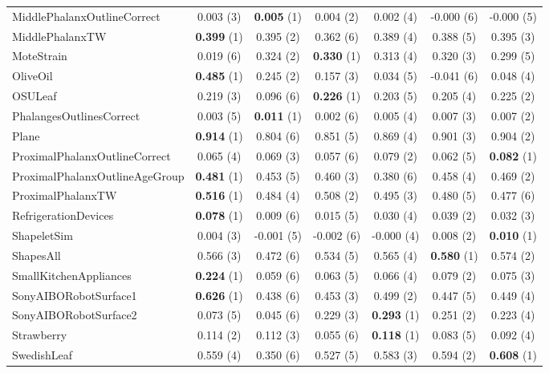 \begin{table}[ht]
\begin{adjustbox}{width=\textwidth}
\begin{tabular}{lcccccc}
    MiddlePhalanxOutlineCorrect & 0.003 (3) & \textbf{0.005} (1) & 0.004 (2) & 0.002 (4) & -0.000 (6) & -0.000 (5) \\
    MiddlePhalanxTW & \textbf{0.399} (1) & 0.395 (2) & 0.362 (6) & 0.389 (4) & 0.388 (5) & 0.395 (3) \\
    MoteStrain & 0.019 (6) & 0.324 (2) & \textbf{0.330} (1) & 0.313 (4) & 0.320 (3) & 0.299 (5) \\
    OliveOil & \textbf{0.485} (1) & 0.245 (2) & 0.157 (3) & 0.034 (5) & -0.041 (6) & 0.048 (4) \\
    OSULeaf & 0.219 (3) & 0.096 (6) & \textbf{0.226} (1) & 0.203 (5) & 0.205 (4) & 0.225 (2) \\
    PhalangesOutlinesCorrect & 0.003 (5) & \textbf{0.011} (1) & 0.002 (6) & 0.005 (4) & 0.007 (3) & 0.007 (2) \\
    Plane & \textbf{0.914} (1) & 0.804 (6) & 0.851 (5) & 0.869 (4) & 0.901 (3) & 0.904 (2) \\
    ProximalPhalanxOutlineCorrect & 0.065 (4) & 0.069 (3) & 0.057 (6) & 0.079 (2) & 0.062 (5) & \textbf{0.082} (1) \\
    ProximalPhalanxOutlineAgeGroup & \textbf{0.481} (1) & 0.453 (5) & 0.460 (3) & 0.380 (6) & 0.458 (4) & 0.469 (2) \\
    ProximalPhalanxTW & \textbf{0.516} (1) & 0.484 (4) & 0.508 (2) & 0.495 (3) & 0.480 (5) & 0.477 (6) \\
    RefrigerationDevices & \textbf{0.078} (1) & 0.009 (6) & 0.015 (5) & 0.030 (4) & 0.039 (2) & 0.032 (3) \\
    ShapeletSim & 0.004 (3) & -0.001 (5) & -0.002 (6) & -0.000 (4) & 0.008 (2) & \textbf{0.010} (1) \\
    ShapesAll & 0.566 (3) & 0.472 (6) & 0.534 (5) & 0.565 (4) & \textbf{0.580} (1) & 0.574 (2) \\
    SmallKitchenAppliances & \textbf{0.224} (1) & 0.059 (6) & 0.063 (5) & 0.066 (4) & 0.079 (2) & 0.075 (3) \\
    SonyAIBORobotSurface1 & \textbf{0.626} (1) & 0.438 (6) & 0.453 (3) & 0.499 (2) & 0.447 (5) & 0.449 (4) \\
    SonyAIBORobotSurface2 & 0.073 (5) & 0.045 (6) & 0.229 (3) & \textbf{0.293} (1) & 0.251 (2) & 0.223 (4) \\
    Strawberry & 0.114 (2) & 0.112 (3) & 0.055 (6) & \textbf{0.118} (1) & 0.083 (5) & 0.092 (4) \\
    SwedishLeaf & 0.559 (4) & 0.350 (6) & 0.527 (5) & 0.583 (3) & 0.594 (2) & \textbf{0.608} (1) \\

\end{tabular}
\end{adjustbox}
\end{table}
